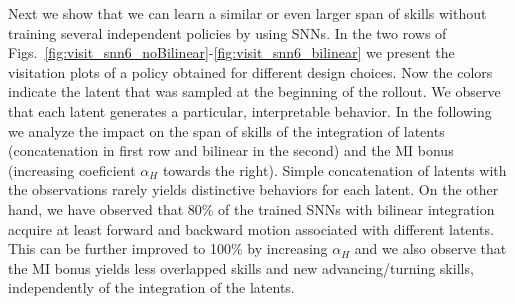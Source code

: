\documentclass{article} %
\begin{document}
Next we show that we can learn a similar or even larger span of skills without training several independent policies by using SNNs. In the two rows of Figs.\ \ref{fig:visit_snn6_noBilinear}-\ref{fig:visit_snn6_bilinear} we present the visitation plots of a policy obtained for different design choices. Now the colors indicate the latent that was sampled at the beginning of the rollout. We observe that each latent generates a particular, interpretable behavior. In the following we analyze the impact on the span of skills of the integration of latents (concatenation in first row and bilinear in the second) and the MI bonus (increasing coeficient $\alpha_H$ towards the right). Simple concatenation of latents with the observations rarely yields distinctive behaviors for each latent. On the other hand, we have observed that 80\% of the trained SNNs with bilinear integration acquire at least forward and backward motion associated with different latents. This can be further improved to 100\% by increasing $\alpha_H$ and we also observe that the MI bonus yields less overlapped skills and new advancing/turning skills, independently of the integration of the latents.
    
\end{document}
